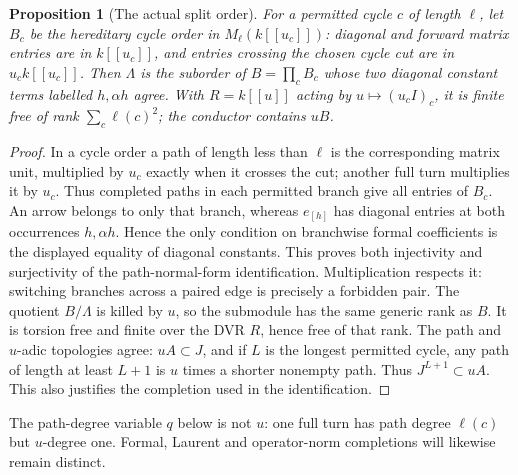 \documentclass[11pt]{article}
\newtheorem{proposition}[theorem]{Proposition}
\theoremstyle{definition}\newtheorem{definition}[theorem]{Definition}
\theoremstyle{remark}\newtheorem{remark}[theorem]{Remark}
\begin{document}
\begin{proposition}[The actual split order]\label{thm:order}
For a permitted cycle $c$ of length $\ell$, let $B_c$ be the hereditary cycle order in $M_\ell(k[[u_c]])$: diagonal and forward matrix entries are in $k[[u_c]]$, and entries crossing the chosen cycle cut are in $u_c k[[u_c]]$. Then $\Lambda$ is the suborder of $B=\prod_c B_c$ whose two diagonal constant terms labelled $h,\alpha h$ agree. With $R=k[[u]]$ acting by $u\mapsto(u_c I)_c$, it is finite free of rank $\sum_c\ell(c)^2$; the conductor contains $uB$.
\end{proposition}
\begin{proof}
In a cycle order a path of length less than $\ell$ is the corresponding matrix unit, multiplied by $u_c$ exactly when it crosses the cut; another full turn multiplies it by $u_c$. Thus completed paths in each permitted branch give all entries of $B_c$. An arrow belongs to only that branch, whereas $e_{[h]}$ has diagonal entries at both occurrences $h,\alpha h$. Hence the only condition on branchwise formal coefficients is the displayed equality of diagonal constants. This proves both injectivity and surjectivity of the path-normal-form identification. Multiplication respects it: switching branches across a paired edge is precisely a forbidden pair. The quotient $B/\Lambda$ is killed by $u$, so the submodule has the same generic rank as $B$. It is torsion free and finite over the DVR $R$, hence free of that rank. The path and $u$-adic topologies agree: $uA\subset J$, and if $L$ is the longest permitted cycle, any path of length at least $L+1$ is $u$ times a shorter nonempty path. Thus $J^{L+1}\subset uA$. This also justifies the completion used in the identification.
\end{proof}
The path-degree variable $q$ below is not $u$: one full turn has path degree $\ell(c)$ but $u$-degree one. Formal, Laurent and operator-norm completions will likewise remain distinct.
\end{document}

